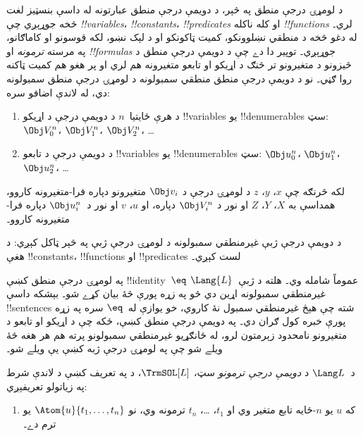 \documentclass[../../../include/open-logic-section]{subfiles}
\begin{document}


د لومړۍ درجې منطق په څېر، د دويمې درجې منطق عبارتونه له داسې بنسټيز
لغت څخه جوړېږي چې \emph{!!{variable}s}، \emph{!!{constant}s}،
\emph{!!{predicate}s} او کله ناکله \emph{!!{function}s} لري۔ له
دغو څخه د منطقي نښلوونکو، کميت ټاکونکو او د لېک نښو، لکه قوسونو او
کاماګانو، په مرسته \emph{ترمونه} او \emph{!!{formula}s} جوړېږي۔
توپير دا دے چې د دويمې درجې منطق د څيزونو د متغيرونو تر څنګ د اړيکو
او تابعو متغيرونه هم لري او پر هغو هم کميت ټاکنه روا ګڼي۔ نو د
دويمې درجې منطق منطقي سمبولونه د لومړۍ درجې منطق سمبولونه دي، له
لاندې اضافو سره:

\begin{enumerate}
\item د هرې ځايتيا~$n$ د دويمې درجې د اړيکو !!{variable}s يو
  !!{denumerable}s سټ: $\Obj V_0^n$، $\Obj V_1^n$، $\Obj V_2^n$، \dots
\item د دويمې درجې د تابعو !!{variable}s يو !!{denumerable}s سټ:
  $\Obj u_0^n$، $\Obj u_1^n$، $\Obj u_2^n$، \dots
\end{enumerate}

لکه څرنګه چې $x$، $y$، $z$ د لومړۍ درجې د $\Obj v_i$ متغيرونو دپاره
فرا-متغيرونه کاروو، همداسې به $X$، $Y$، $Z$ او نور د $\Obj V_i^n$
دپاره، او $u$، $v$ او نور د~$\Obj u_i^n$ دپاره فرا-متغيرونه کاروو۔

\begin{explain}
د دويمې درجې ژبې غيرمنطقي سمبولونه د لومړۍ درجې ژبې په څېر ټاکل
کېږي: د هغې !!{constant}s، !!{function}s او !!{predicate}s
لست کېږي۔

په لومړۍ درجې منطق کښې !!{identity}~$\eq$ عموماً شامله وي۔ هلته
د ژبې~$\Lang{L}$ غيرمنطقي سمبولونه اړين دي څو په زړه پورې څۀ بيان
کړے شو۔ بېشکه داسې !!{sentence}s شته چې هېڅ غيرمنطقي سمبول نۀ
کاروي، خو يوازې له~$\eq$ سره په زړه پورې خبره کول ګران دي۔ په
دويمې درجې منطق کښې، ځکه چې د اړيکو او تابعو د متغيرونو نامحدود
زېرمتون لرو، له ځانګړيو غيرمنطقي سمبولونو پرته هم هر هغه څۀ ويلے شو
چې په لومړۍ درجې ژبه کښې يې ويلے شو۔
\end{explain}

\begin{defn}
د~$\Lang L$ د \emph{دويمې درجې ترمونو} سټ، $\TrmSOL[L]$، د
 په تعريف کښې د لاندې شرط په زياتولو
تعريفېږي:
\begin{enumerate}
\item که $u$ يو $n$-ځايه تابع متغير وي او $t_1$، \dots، $t_n$
  ترمونه وي، نو $\Atom{u}{t_1, \ldots, t_n}$ يو ترم دے۔
\end{enumerate}
\end{defn}
\end{document}
